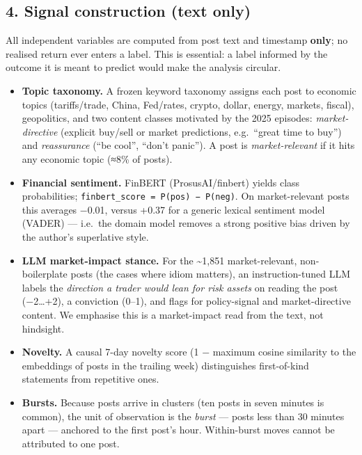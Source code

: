 \documentclass[
]{article}
\providecommand{\tightlist}{%
  \setlength{\itemsep}{0pt}\setlength{\parskip}{0pt}}
\begin{document}
\subsection{4. Signal construction (text
only)}\label{signal-construction-text-only}

All independent variables are computed from post text and timestamp
\textbf{only}; no realised return ever enters a label. This is
essential: a label informed by the outcome it is meant to predict would
make the analysis circular.

\begin{itemize}
\tightlist
\item
  \textbf{Topic taxonomy.} A frozen keyword taxonomy assigns each post
  to economic topics (tariffs/trade, China, Fed/rates, crypto, dollar,
  energy, markets, fiscal), geopolitics, and two content classes
  motivated by the 2025 episodes: \emph{market-directive} (explicit
  buy/sell or market predictions, e.g.~``great time to buy'') and
  \emph{reassurance} (``be cool'', ``don't panic''). A post is
  \emph{market-relevant} if it hits any economic topic (≈8\% of posts).
\item
  \textbf{Financial sentiment.} FinBERT (ProsusAI/finbert) yields class
  probabilities; \texttt{finbert\_score\ =\ P(pos)\ −\ P(neg)}. On
  market-relevant posts this averages −0.01, versus +0.37 for a generic
  lexical sentiment model (VADER) --- i.e.~the domain model removes a
  strong positive bias driven by the author's superlative style.
\item
  \textbf{LLM market-impact stance.} For the \textasciitilde1,851
  market-relevant, non-boilerplate posts (the cases where idiom
  matters), an instruction-tuned LLM labels the \emph{direction a trader
  would lean for risk assets} on reading the post (−2\ldots+2), a
  conviction (0--1), and flags for policy-signal and market-directive
  content. We emphasise this is a market-impact read from the text, not
  hindsight.
\item
  \textbf{Novelty.} A causal 7-day novelty score (1 − maximum cosine
  similarity to the embeddings of posts in the trailing week)
  distinguishes first-of-kind statements from repetitive ones.
\item
  \textbf{Bursts.} Because posts arrive in clusters (ten posts in seven
  minutes is common), the unit of observation is the \emph{burst} ---
  posts less than 30 minutes apart --- anchored to the first post's
  hour. Within-burst moves cannot be attributed to one post.
\end{itemize}
\end{document}
